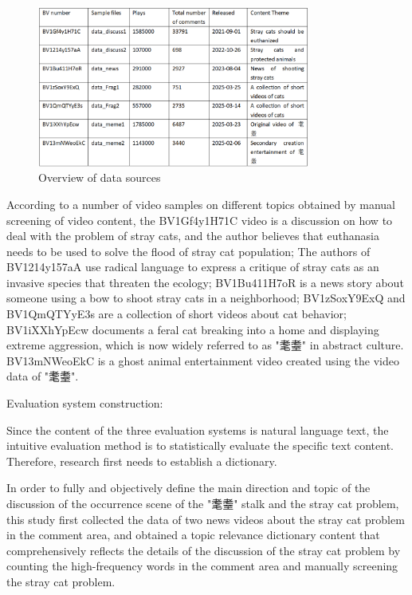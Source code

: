 \documentclass[12pt,a4paper]{ctexart}
\theoremstyle{MyLineTheoremStyle}
\theoremstyle{MyBlockTheoremStyle}
\theoremstyle{MySubsubsectionStyle}
\begin{document}
\begin{figure}[htbp]
    \centering
    \includegraphics[width=0.8\textwidth]{img/data_sources_2.png}
    \caption{Overview of data sources}
    \label{fig:data_sources_2}
\end{figure}
\newpage

According to a number of video samples on different topics obtained by manual screening of video content, the BV1Gf4y1H71C video is a discussion on how to deal with the problem of stray cats, and the author believes that euthanasia needs to be used to solve the flood of stray cat population; The authors of BV1214y157aA use radical language to express a critique of stray cats as an invasive species that threaten the ecology; BV1Bu411H7oR is a news story about someone using a bow to shoot stray cats in a neighborhood; BV1zSoxY9ExQ and BV1QmQTYyE3s are a collection of short videos about cat behavior; BV1iXXhYpEcw documents a feral cat breaking into a home and displaying extreme aggression, which is now widely referred to as "耄耋" in abstract culture. BV13mNWeoEkC is a ghost animal entertainment video created using the video data of "耄耋".

Evaluation system construction:

Since the content of the three evaluation systems is natural language text, the intuitive evaluation method is to statistically evaluate the specific text content. Therefore, research first needs to establish a dictionary.

In order to fully and objectively define the main direction and topic of the discussion of the occurrence scene of the "耄耋" stalk and the stray cat problem, this study first collected the data of two news videos about the stray cat problem in the comment area, and obtained a topic relevance dictionary content that comprehensively reflects the details of the discussion of the stray cat problem by counting the high-frequency words in the comment area and manually screening the stray cat problem.
\end{document}
